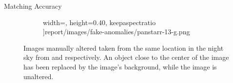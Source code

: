 \begin{frame}{Matching Accuracy}
\begin{figure}[H]
\begin{subfigure}{.5\textwidth}
                width=\textwidth,
                height=0.40\textheight,
                keepaspectratio
          ]{report/images/fake-anomalies/panstarr-13-g.png}
          \caption{\panstarrs}
        \end{subfigure}
        \caption{Images manually altered taken from the same location in the night sky from \usno and \panstarrs respectively. An object close to the center of the \panstarrs image has been replaced by the image's background, while the \usno image is unaltered.}
    \end{figure}
\end{frame}